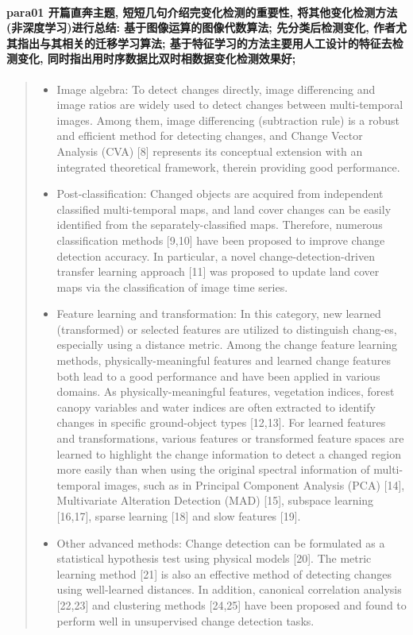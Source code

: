 \paragraph*{para01 
    \textcolor[RGB]{17, 205, 29}{开篇直奔主题, 短短几句介绍完变化检测的重要性, 将其他变化检测方法(非深度学习)进行总结: 基于图像运算的图像代数算法; 先分类后检测变化, 作者尤其指出与其相关的迁移学习算法; 基于特征学习的方法主要用人工设计的特征去检测变化, 同时指出用时序数据比双时相数据变化检测效果好; }}
\begin{quotation}
    \itshape
    \begin{itemize}
        \item Image algebra: To detect changes directly, image differencing and image ratios are widely used to detect changes between multi-temporal images. Among them, image differencing (subtraction rule) is a robust and efficient method for detecting changes, and Change Vector Analysis (CVA) [8] represents its conceptual extension with an integrated theoretical framework, therein providing good performance.
        \item Post-classification: Changed objects are acquired from independent classified multi-temporal maps, and land cover changes can be easily identified from the  separately-classified maps. Therefore, numerous classification methods [9,10] have been proposed to improve change detection accuracy. In particular, a novel change-detection-driven transfer learning approach [11] was proposed to update land cover maps via the classification of image time series.
        \item Feature learning and transformation: In this category, new learned (transformed) or selected features are utilized to distinguish chang-es, especially using a distance metric. Among the change feature learning methods, physically-meaningful features and learned change
        features both lead to a good performance and have been applied in various domains. As 
        physically-meaningful features, vegetation indices, forest canopy variables and water indices are often extracted to identify changes in specific ground-object types [12,13]. For learned features and transformations, various features or transformed feature spaces are learned to highlight the change information to detect a changed region more easily than when using the original spectral information of multi-temporal images, such as in Principal Component Analysis (PCA) [14], Multivariate Alteration Detection (MAD) [15], subspace learning [16,17], sparse learning [18] and
        slow features [19].
        \item Other advanced methods: Change detection can be formulated as a statistical hypothesis test
        using physical models [20]. The metric learning method [21] is also an effective method of
        detecting changes using well-learned distances. In addition, canonical correlation analysis [22,23] and clustering methods [24,25] have been proposed and found to perform well in unsupervised
        change detection tasks.
    \end{itemize}
\end{quotation}

